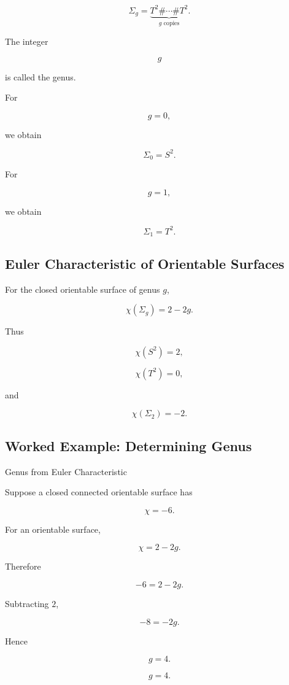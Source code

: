\[
\boxed{
\Sigma_g
=
\underbrace{
T^2\#\cdots\#T^2
}_{g\text{ copies}}.
}
\]

The integer

\[
g
\]

is called the genus.

For

\[
g=0,
\]

we obtain

\[
\Sigma_0=S^2.
\]

For

\[
g=1,
\]

we obtain

\[
\Sigma_1=T^2.
\]

\subsection{Euler Characteristic of Orientable Surfaces}
\label{subsec:euler-characteristic-orientable-surfaces}

For the closed orientable surface of genus \(g\),

\[
\boxed{
\chi(\Sigma_g)=2-2g.
}
\]

Thus

\[
\chi(S^2)=2,
\]

\[
\chi(T^2)=0,
\]

and

\[
\chi(\Sigma_2)=-2.
\]

\subsection{Worked Example: Determining Genus}
\label{subsec:worked-surface-genus}

\begin{workedexamplebox}{Genus from Euler Characteristic}

Suppose a closed connected orientable surface has

\[
\chi=-6.
\]

For an orientable surface,

\[
\chi=2-2g.
\]

Therefore

\[
-6=2-2g.
\]

Subtracting \(2\),

\[
-8=-2g.
\]

Hence

\[
g=4.
\]

\begin{answerbox}
\[
\boxed{
g=4.
}
\]
\end{answerbox}
\end{workedexamplebox}

